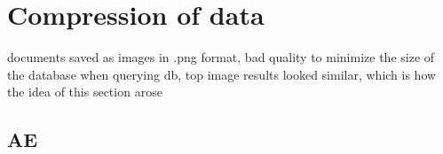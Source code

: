 \section{Compression of data}\label{subsec:compression}


documents saved as images in .png format, bad quality to minimize the size of the database
when querying db, top image results looked similar, which is how the idea of this section arose

\subsection{AE}\label{subsec:autoencoder}

